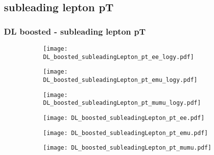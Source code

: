 \documentclass[aspectratio=169,8pt]{beamer}
\begin{document}
\subsection{subleading lepton pT}
\begin{frame}
\frametitle{DL boosted - subleading lepton pT}
\begin{figure}
\captionsetup[subfigure]{labelformat=empty}
\begin{subfigure}{0.32\textwidth}
\texttt{[image: DL\_boosted\_subleadingLepton\_pt\_ee\_logy.pdf]}
\vspace*{-0.15cm}
\end{subfigure}
\hfil
\begin{subfigure}{0.32\textwidth}
\texttt{[image: DL\_boosted\_subleadingLepton\_pt\_emu\_logy.pdf]}
\vspace*{-0.15cm}
\end{subfigure}
\hfil
\begin{subfigure}{0.32\textwidth}
\texttt{[image: DL\_boosted\_subleadingLepton\_pt\_mumu\_logy.pdf]}
\vspace*{-0.15cm}
\end{subfigure}
\hfil
\begin{subfigure}{0.32\textwidth}
\texttt{[image: DL\_boosted\_subleadingLepton\_pt\_ee.pdf]}
\vspace*{-0.15cm}
\end{subfigure}
\hfil
\begin{subfigure}{0.32\textwidth}
\texttt{[image: DL\_boosted\_subleadingLepton\_pt\_emu.pdf]}
\vspace*{-0.15cm}
\end{subfigure}
\hfil
\begin{subfigure}{0.32\textwidth}
\texttt{[image: DL\_boosted\_subleadingLepton\_pt\_mumu.pdf]}
\vspace*{-0.15cm}
\end{subfigure}
\hfil
\end{figure}
\end{frame}
\newpage
\end{document}
